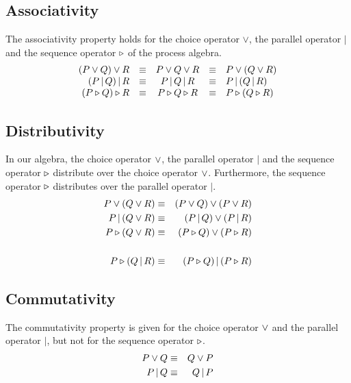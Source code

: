 \subsection{Associativity}
The associativity property holds for the choice operator $\vee$, the parallel operator $|$ and the sequence operator $\triangleright$ of the process algebra.
\begin{equation*}
\begin{array}{rcccl}
  \left( P \vee Q \right) \vee R & \equiv & P \vee Q \vee R & \equiv & P \vee \left( Q \vee R \right) \\
  \left( P \,|\, Q \right) |\, R & \equiv & P \,|\, Q \,|\, R & \equiv & P \,| \left( Q \,|\, R \right) \\
  \left( P \triangleright Q \right) \triangleright R & \equiv & P \triangleright Q \triangleright R & \equiv & P \triangleright \left( Q \triangleright R \right)
\end{array}
\end{equation*}

\subsection{Distributivity}
In our algebra, the choice operator $\vee$, the parallel operator $|$ and the sequence operator $\triangleright$ distribute over the choice operator $\vee$. Furthermore, the sequence operator $\triangleright$ distributes over the parallel operator $|$.
\begin{eqnarray*}
  P \vee \left( Q \vee R \right) & \equiv & \left( P \vee Q \right) \vee \left( P \vee R \right) \\
  P \,| \left( Q \vee R \right) & \equiv & \left( P \,|\, Q \right) \vee \left( P \,|\, R \right) \\
  P \triangleright \left( Q \vee R \right) & \equiv & \left( P \triangleright Q \right) \vee \left( P \triangleright R \right) \\
  & & \\
  P \triangleright \left( Q \,|\, R \right) & \equiv & \left( P \triangleright Q \right) | \left( P \triangleright R \right)
\end{eqnarray*}

\subsection{Commutativity}
The commutativity property is given for the choice operator $\vee$ and the parallel operator $|$, but not for the sequence operator $\triangleright$.
\begin{eqnarray*}
  P \vee Q & \equiv & Q \vee P \\
  P \,|\, Q & \equiv & Q \,|\, P
\end{eqnarray*}

